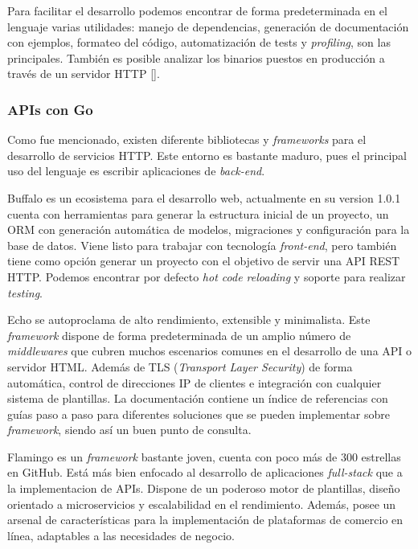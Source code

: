 Para facilitar el desarrollo podemos encontrar de forma predeterminada en el lenguaje varias utilidades: manejo de dependencias, generación de documentación con ejemplos, formateo del código, automatización de tests y \textit{profiling}, son las principales. También es posible analizar los binarios puestos en producción a través de un servidor HTTP [\cite{go-pros-cons}].

\subsubsection{APIs con Go}

Como fue mencionado, existen diferente bibliotecas y \textit{frameworks} para el desarrollo de servicios HTTP. Este entorno es bastante maduro, pues el principal uso del lenguaje es escribir aplicaciones de \textit{back-end}.

Buffalo es un ecosistema para el desarrollo web, actualmente en su version 1.0.1 cuenta con herramientas para generar la estructura inicial de un proyecto, un ORM con generación automática de modelos, migraciones y configuración para la base de datos. Viene listo para trabajar con tecnología \textit{front-end}, pero también tiene como opción generar un proyecto con el objetivo de servir una API REST HTTP. Podemos encontrar por defecto \textit{hot code reloading} y soporte para realizar \textit{testing}.
              
Echo se autoproclama de alto rendimiento, extensible y minimalista. Este \textit{framework} dispone de forma predeterminada de un amplio número de \textit{middlewares} que cubren muchos escenarios comunes en el desarrollo de una API o servidor HTML. Además de TLS (\textit{Transport Layer Security}) de forma automática, control de direcciones IP de clientes e integración con cualquier sistema de plantillas. La documentación contiene un índice de referencias con guías paso a paso para diferentes soluciones que se pueden implementar sobre \textit{framework}, siendo así un buen punto de consulta.

Flamingo es un \textit{framework} bastante joven, cuenta con poco más de 300 estrellas en GitHub. Está más bien enfocado al desarrollo de aplicaciones \textit{full-stack} que a la implementacion de APIs. Dispone de un poderoso motor de plantillas, diseño orientado a microservicios y escalabilidad en el rendimiento. Además, posee un arsenal de características para la implementación de plataformas de comercio en línea, adaptables a las necesidades de negocio.

